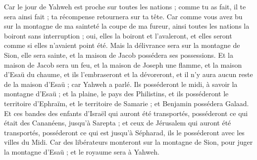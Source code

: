 \begin{multicols}{2}
Car le jour de Yahweh est proche sur toutes les nations ; comme tu as fait, il te sera ainsi fait ; ta récompense retournera sur ta tête.
Car comme vous avez bu sur la montagne de ma sainteté la coupe de ma fureur, ainsi toutes les nations la boiront sans interruption ; oui, elles la boiront et l'avaleront, et elles seront comme si elles n'avaient point été.
Mais la délivrance sera sur la montagne de Sion, elle sera sainte, et la maison de Jacob possédera ses possessions.
Et la maison de Jacob sera un feu, et la maison de Joseph une flamme, et la maison d'Esaü du chaume, et ils l'embraseront et la dévoreront, et il n'y aura aucun reste de la maison d'Esaü ; car Yahweh a parlé.
Ils posséderont le midi, à savoir la montagne d'Esaü ; et la plaine, le pays des Philistins, et ils posséderont le territoire d'Ephraïm, et le territoire de Samarie ; et Benjamin possédera Galaad.
Et ces bandes des enfants d'Israël qui auront été transportés, posséderont ce qui était des Cananéens, jusqu'à Sarepta ; et ceux de Jérusalem qui auront été transportés, posséderont ce qui est jusqu'à Sépharad, ils le posséderont avec les villes du Midi.
Car des libérateurs monteront sur la montagne de Sion, pour juger la montagne d'Esaü ; et le royaume sera à Yahweh.
\PPE{}
\end{multicols}
